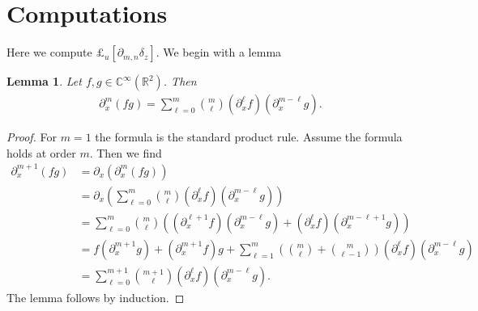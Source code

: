 \documentclass[12pt]{amsart}
\newcommand{\R}{\ensuremath{\mathbb{R}}}
\newtheorem{lem}[thm]{Lemma}
\begin{document}
\appendix
\section{Computations}
\label{app:computation}

Here we compute $\pounds_u [\partial_{m,n} \delta_z]$.
We begin with a lemma
\begin{lem}
  Let $f,g \in \mathbb{C}^\infty(\R^2)$.  Then
  \begin{align*}
    \partial_x^m ( fg) = \sum_{\ell=0}^{m} \binom{m}{\ell} (\partial_x^\ell f)(\partial_x^{m-\ell}g).
  \end{align*}
\end{lem}
\begin{proof}
  For $m=1$ the formula is the standard product rule.
  Assume the formula holds at order $m$.
  Then we find
  \begin{align*}
    \partial_x^{m+1} (fg) &= \partial_x ( \partial_x^{m}(fg)) \\
    &= \partial_x \left( \sum_{\ell=0}^{m} \binom{m}{\ell} (\partial_x^\ell f)(\partial_x^{m-\ell}g) \right) \\
    &= \sum_{\ell=0}^{m} \binom{m}{\ell}\left(
      ( \partial_x^{\ell + 1} f) (\partial_x^{m-\ell}g) 
      + ( \partial_x^{\ell} f) (\partial_x^{m-\ell+1}g)
      \right) \\
     &= f (\partial_x^{m+1}g) +(\partial_x^{m+1}f) g + \sum_{\ell=1}^{m} \left( \binom{m}{\ell} + \binom{m}{\ell-1} \right) (\partial_x^\ell f)(\partial_x^{m-\ell}g) \\
     &= \sum_{\ell=0}^{m+1} \binom{m+1}{\ell} (\partial_x^\ell f)(\partial_x^{m-\ell}g).
  \end{align*}
  The lemma follows by induction.
\end{proof}
\end{document}

